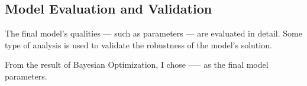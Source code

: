 \subsection{Model Evaluation and Validation}
The final model’s qualities — such as parameters — are evaluated in detail. Some type of analysis is used to validate the robustness of the model’s solution.

From the result of Bayesian Optimization, I chose ----- as the final model parameters.

